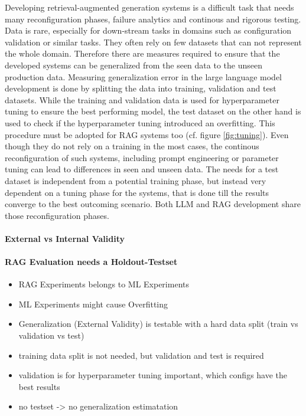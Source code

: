 Developing retrieval-augmented generation systems is a difficult task that needs many reconfiguration phases, failure analytics and continous and rigorous testing.\cite{Simon.10112024,Barnett.2024,Ru.15.08.2024} Data is rare, especially for down-stream tasks in domains such as configuration validation or similar tasks. They often rely on few datasets that can not represent the whole domain. Therefore there are measures required to ensure that the developed systems can be generalized from the seen data to the unseen production data. Measuring generalization error in the large language model development is done by splitting the data into training, validation and test datasets. While the training and validation data is used for hyperparameter tuning to ensure the best performing model, the test dataset on the other hand is used to check if the hyperparameter tuning introduced an overfitting. This procedure must be adopted for RAG systems too (cf. figure \ref{fig:tuning}). Even though they do not rely on a training in the most cases, the continous reconfiguration of such systems, including prompt engineering or parameter tuning can lead to differences in seen and unseen data. The needs for a test dataset is independent from a potential training phase, but instead very dependent on a tuning phase for the systems, that is done till the results converge to the best outcoming scenario. Both LLM and RAG development share those reconfiguration phases.


\paragraph{External vs Internal Validity}

\paragraph{RAG Evaluation needs a Holdout-Testset}
\begin{itemize}
    \item RAG Experiments belongs to ML Experiments
    \item ML Experiments might cause Overfitting
    \item Generalization (External Validity) is testable with a hard data split (train vs validation vs test)
    \item training data split is not needed, but validation and test is required
    \item validation is for hyperparameter tuning important, which configs have the best results
    \item no testset -> no generalization estimatation
\end{itemize}

